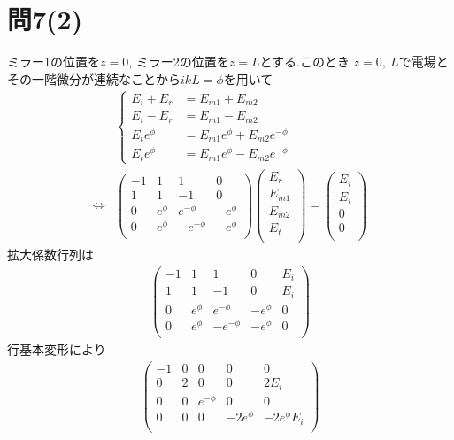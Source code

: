 \documentclass[uplatex,a4j,11pt,dvipdfmx]{jsarticle}
\begin{document}
\section*{問7(2)}
ミラー1の位置を$z=0$, ミラー2の位置を$z=L$とする.このとき
$z=0,\ L$で電場とその一階微分が連続なことから$ikL=\phi$を用いて
\begin{eqnarray}
  &\begin{cases}
      E_i+E_r&=E_{m1}+E_{m2}\\
      E_i-E_r&=E_{m1}-E_{m2}\\
      E_te^\phi&=E_{m1}e^\phi+E_{m2}e^{-\phi}\\
      E_te^\phi&=E_{m1}e^\phi-E_{m2}e^{-\phi}
  \end{cases}\nonumber\\
  \iff&\begin{pmatrix}
    -1&1&1&0\\
    1&1&-1&0\\
    0&e^\phi&e^{-\phi}&-e^\phi\\
    0&e^\phi&-e^{-\phi}&-e^\phi\\
  \end{pmatrix}
  \begin{pmatrix}
    E_r\\E_{m1}\\E_{m2}\\E_t\\
  \end{pmatrix}
  =\begin{pmatrix}
    E_i\\E_i\\0\\0\\
  \end{pmatrix}
\end{eqnarray}
拡大係数行列は
\begin{align}
  \begin{pmatrix}
    -1&1&1&0&E_i\\
    1&1&-1&0&E_i\\
    0&e^\phi&e^{-\phi}&-e^\phi&0\\
    0&e^\phi&-e^{-\phi}&-e^\phi&0\\
  \end{pmatrix}
\end{align}
行基本変形により
\begin{align}
  \begin{pmatrix}
    -1&0&0&0&0\\
    0&2&0&0&2E_i\\
    0&0&e^{-\phi}&0&0\\
    0&0&0&-2e^\phi&-2e^\phi E_i\\
  \end{pmatrix}
\end{align}
\end{document}
